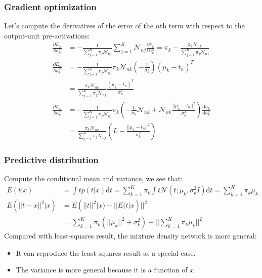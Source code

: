 \documentclass{beamer}
\begin{document}
\begin{frame}
    \frametitle{Gradient optimization}
    Let's compute the derivatives of the error of the $n$th term with respect to the output-unit pre-activations:
    \begin{align*}
        \frac{\partial{}E_{n}}{\partial{}a^{\pi}_{k}}&=-\frac{1}{\sum_{j=1}^{K}\pi_{j}\mathcal{N}_{nj}}\sum_{j=1}^{K}\mathcal{N}_{nj}\frac{\partial\pi_{k}}{\partial{}a^{\pi}_{k}}=\pi_{k}-\frac{\pi_{k}\mathcal{N}_{nk}}{\sum_{j=1}^{K}\pi_{j}\mathcal{N}_{nj}} \\
        \frac{\partial{}E_{n}}{\partial{}a^{\mu}_{k}}&=-\frac{1}{\sum_{j=1}^{K}\pi_{j}\mathcal{N}_{nj}}\pi_{k}\mathcal{N}_{nk}(-\frac{1}{\sigma^{2}_{k}})(\mu_{k}-t_{n})^{T} \\
        &=\frac{\pi_{k}\mathcal{N}_{nk}}{\sum_{j=1}^{K}\pi_{j}\mathcal{N}_{nj}}\frac{(\mu_{k}-t_{n})^{T}}{\sigma^{2}_{k}} \\
        \frac{\partial{}E_{n}}{\partial{}a^{\sigma}_{k}}&=-\frac{1}{\sum_{j=1}^{K}\pi_{j}\mathcal{N}_{nj}}\pi_{k}(-\frac{L}{\sigma_{k}}\mathcal{N}_{nk}+\mathcal{N}_{nk}\frac{||\mu_{k}-t_{n}||^{2}}{\sigma_{k}^{3}})\frac{\mathrm{d}\sigma_{k}}{\mathrm{d}a^{\sigma}_{k}} \\
        &=\frac{\pi_{k}\mathcal{N}_{nk}}{\sum_{j=1}^{K}\pi_{j}\mathcal{N}_{nj}}(L-\frac{||\mu_{k}-t_{n}||^{2}}{\sigma^{2}_{k}})
    \end{align*}
\end{frame}

\begin{frame}
    \frametitle{Predictive distribution}
    Compute the conditional mean and variance, we see that:
    \begin{align*}
        E(t|x)&=\int{}tp(t|x)\mathrm{d}t=\sum_{k=1}^{K}\pi_{k}\int{t}\mathcal{N}(t;\mu_{k},\sigma^{2}_{k}I)\mathrm{d}t=\sum_{k=1}^{K}\pi_{k}\mu_{k} \\
        E(||t-x||^{2}|x)&=E(||t||^{2}|x)-||E(t|x)||^{2} \\
        &=\sum_{k=1}^{K}\pi_{k}(||\mu_{k}||^{2}+\sigma^{2}_{k})-||\sum_{k=1}^{K}\pi_{k}\mu_{k}||^{2}
    \end{align*}
    Compared with least-squares result, the mixture density network is more general:
    \begin{itemize}
        \item It can reproduce the least-squares result as a special case.
        \item The variance is more general because it is a function of $x$.
    \end{itemize}
\end{frame}
\end{document}
